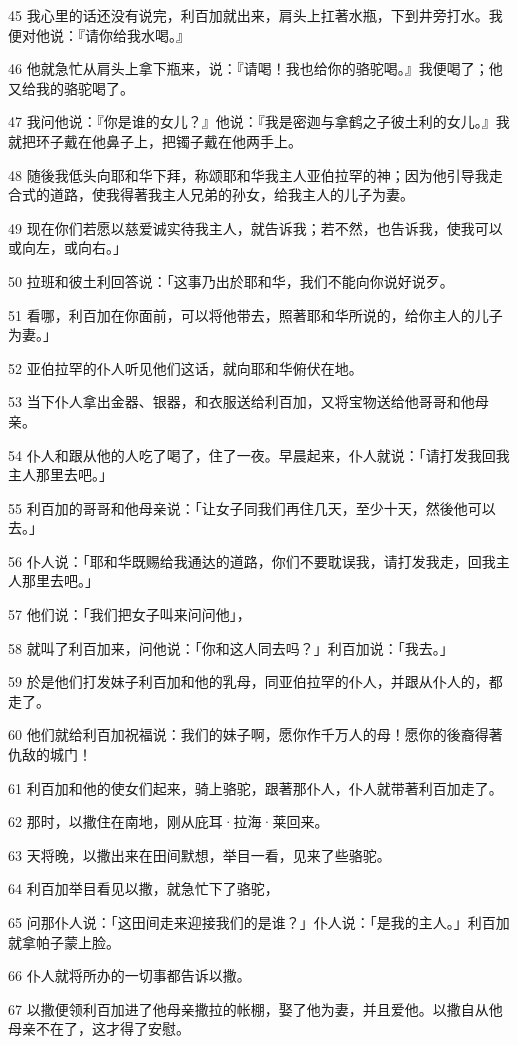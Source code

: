 \par 45 我心里的话还没有说完，利百加就出来，肩头上扛著水瓶，下到井旁打水。我便对他说：『请你给我水喝。』
\par 46 他就急忙从肩头上拿下瓶来，说：『请喝！我也给你的骆驼喝。』我便喝了；他又给我的骆驼喝了。
\par 47 我问他说：『你是谁的女儿？』他说：『我是密迦与拿鹤之子彼土利的女儿。』我就把环子戴在他鼻子上，把镯子戴在他两手上。
\par 48 随後我低头向耶和华下拜，称颂耶和华我主人亚伯拉罕的神；因为他引导我走合式的道路，使我得著我主人兄弟的孙女，给我主人的儿子为妻。
\par 49 现在你们若愿以慈爱诚实待我主人，就告诉我；若不然，也告诉我，使我可以或向左，或向右。」
\par 50 拉班和彼土利回答说：「这事乃出於耶和华，我们不能向你说好说歹。
\par 51 看哪，利百加在你面前，可以将他带去，照著耶和华所说的，给你主人的儿子为妻。」
\par 52 亚伯拉罕的仆人听见他们这话，就向耶和华俯伏在地。
\par 53 当下仆人拿出金器、银器，和衣服送给利百加，又将宝物送给他哥哥和他母亲。
\par 54 仆人和跟从他的人吃了喝了，住了一夜。早晨起来，仆人就说：「请打发我回我主人那里去吧。」
\par 55 利百加的哥哥和他母亲说：「让女子同我们再住几天，至少十天，然後他可以去。」
\par 56 仆人说：「耶和华既赐给我通达的道路，你们不要耽误我，请打发我走，回我主人那里去吧。」
\par 57 他们说：「我们把女子叫来问问他」，
\par 58 就叫了利百加来，问他说：「你和这人同去吗？」利百加说：「我去。」
\par 59 於是他们打发妹子利百加和他的乳母，同亚伯拉罕的仆人，并跟从仆人的，都走了。
\par 60 他们就给利百加祝福说：我们的妹子啊，愿你作千万人的母！愿你的後裔得著仇敌的城门！
\par 61 利百加和他的使女们起来，骑上骆驼，跟著那仆人，仆人就带著利百加走了。
\par 62 那时，以撒住在南地，刚从庇耳·拉海·莱回来。
\par 63 天将晚，以撒出来在田间默想，举目一看，见来了些骆驼。
\par 64 利百加举目看见以撒，就急忙下了骆驼，
\par 65 问那仆人说：「这田间走来迎接我们的是谁？」仆人说：「是我的主人。」利百加就拿帕子蒙上脸。
\par 66 仆人就将所办的一切事都告诉以撒。
\par 67 以撒便领利百加进了他母亲撒拉的帐棚，娶了他为妻，并且爱他。以撒自从他母亲不在了，这才得了安慰。

